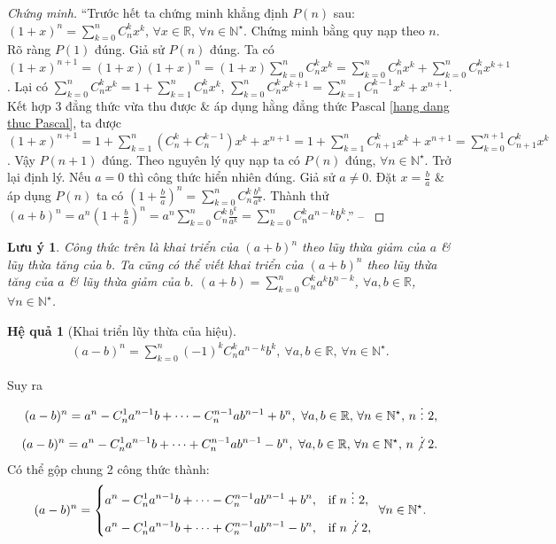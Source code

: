 \documentclass[oneside]{book}
\numberwithin{equation}{section}
\newtheorem{hequa}{Hệ quả}[section]
\newtheorem{luuy}{Lưu ý}[section]
\begin{document}
\begin{proof}[Chứng minh]
	``Trước hết ta chứng minh khẳng định $P(n)$ sau: $(1 + x)^n = \sum_{k=0}^n C_n^kx^k$, $\forall x\in\mathbb{R}$, $\forall n\in\mathbb{N}^\star$. Chứng minh bằng quy nạp theo $n$. Rõ ràng $P(1)$ đúng. Giả sử $P(n)$ đúng. Ta có $(1 + x)^{n+1} = (1 + x)(1 + x)^n = (1 + x)\sum_{k=0}^n C_n^kx^k = \sum_{k=0}^n C_n^kx^k + \sum_{k=0}^n C_n^kx^{k+1}$. Lại có $\sum_{k=0}^n C_n^k x^k = 1 + \sum_{k=1}^n C_n^kx^k$, $\sum_{k=0}^n C_n^kx^{k+1} = \sum_{k=1}^n C_n^{k-1}x^k + x^{n+1}$. Kết hợp 3 đẳng thức vừa thu được \& áp dụng hằng đẳng thức Pascal \eqref{hang dang thuc Pascal}, ta được $(1 + x)^{n+1} = 1 + \sum_{k=1}^n (C_n^k + C_n^{k-1})x^k + x^{n+1} = 1 + \sum_{k=1}^n C_{n+1}^kx^k + x^{n+1} = \sum_{k=0}^{n+1} C_{n+1}^kx^k$. Vậy $P(n+1)$ đúng. Theo nguyên lý quy nạp ta có $P(n)$ đúng, $\forall n\in\mathbb{N}^\star$. Trở lại định lý. Nếu $a = 0$ thì công thức hiển nhiên đúng. Giả sử $a\ne 0$. Đặt $x = \frac{b}{a}$ \& áp dụng $P(n)$ ta có $\left(1 + \frac{b}{a}\right)^n = \sum_{k=0}^n C_n^k\frac{b^k}{a^k}$. Thành thử $(a + b)^n = a^n\left(1 + \frac{b}{a}\right)^n = a^n\sum_{k=0}^n C_n^k\frac{b^k}{a^k} = \sum_{k=0}^n C_n^ka^{n-k}b^k$.'' -- \cite[pp. 90--91]{TL_chuyen_Toan_Dai_So_Giai_Tich_11}
\end{proof}

\begin{luuy}
	Công thức trên là khai triển của $(a + b)^n$ theo lũy thừa giảm của $a$ \& lũy thừa tăng của $b$. Ta cũng có thể viết khai triển của $(a + b)^n$ theo lũy thừa tăng của $a$ \& lũy thừa giảm của $b$. $(a + b) = \sum_{k=0}^n C_n^ka^kb^{n - k}$, $\forall a,b\in\mathbb{R}$, $\forall n\in\mathbb{N}^\star$.
\end{luuy}

\begin{hequa}[Khai triển lũy thừa của hiệu]
	\begin{align*}
		(a - b)^n = \sum_{k=0}^n (-1)^kC_n^ka^{n-k}b^k,\ \forall a,b\in\mathbb{R},\,\forall n\in\mathbb{N}^\star.
	\end{align*}
\end{hequa}
Suy ra
\begin{align*}
	(a - b)^n = a^n - C_n^1a^{n-1}b + \cdots - C_n^{n-1}ab^{n-1} + b^n,\ \forall a,b\in\mathbb{R},\,\forall n\in\mathbb{N}^\star,\,n\ \vdots\ 2,\\
	(a - b)^n = a^n - C_n^1a^{n-1}b + \cdots + C_n^{n-1}ab^{n-1} - b^n,\ \forall a,b\in\mathbb{R},\,\forall n\in\mathbb{N}^\star,\,n\not\vdots\ 2.
\end{align*}
Có thể gộp chung 2 công thức thành:
\begin{equation*}
	(a - b)^n = \left\{\begin{split}
		&a^n - C_n^1a^{n-1}b + \cdots - C_n^{n-1}ab^{n-1} + b^n,&&\mbox{if } n\ \vdots\ 2,\\
		&a^n - C_n^1a^{n-1}b + \cdots + C_n^{n-1}ab^{n-1} - b^n,&&\mbox{if } n\not\vdots\ 2,
	\end{split}\right.\ \forall n\in\mathbb{N}^\star.
\end{equation*}
\end{document}
